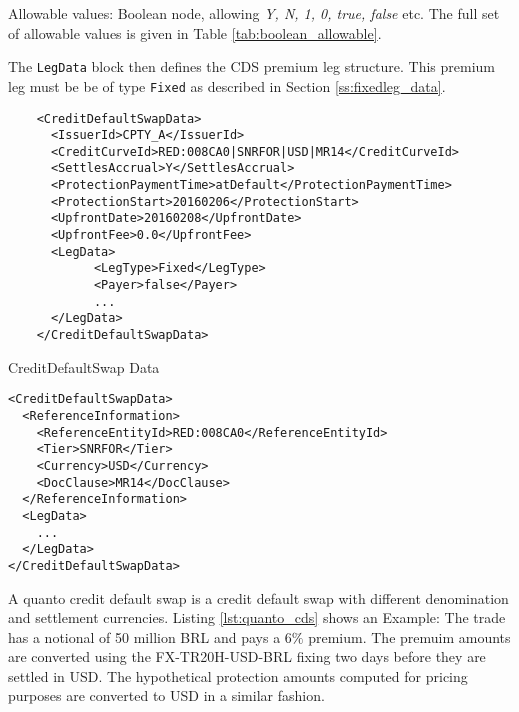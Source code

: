 \begin{itemize}
Allowable values: Boolean node, allowing \emph{Y, N, 1, 0, true, false} etc. The full set of allowable values is given in Table \ref{tab:boolean_allowable}.
\end{itemize}

The \lstinline!LegData! block then defines the CDS premium leg structure. This premium leg must be be of type \lstinline!Fixed! as described in Section \ref{ss:fixedleg_data}.

\begin{listing}[H]
\begin{verbatim}
    <CreditDefaultSwapData>
      <IssuerId>CPTY_A</IssuerId>
      <CreditCurveId>RED:008CA0|SNRFOR|USD|MR14</CreditCurveId>
      <SettlesAccrual>Y</SettlesAccrual>
      <ProtectionPaymentTime>atDefault</ProtectionPaymentTime>
      <ProtectionStart>20160206</ProtectionStart>
      <UpfrontDate>20160208</UpfrontDate>
      <UpfrontFee>0.0</UpfrontFee>
      <LegData>
            <LegType>Fixed</LegType>
            <Payer>false</Payer>
            ...
      </LegData>
    </CreditDefaultSwapData>
\end{verbatim}
\caption{CreditDefaultSwap Data}
\label{lst:cdsdata}
\end{listing}

\begin{listing}[H]
\begin{verbatim}
<CreditDefaultSwapData>
  <ReferenceInformation>
    <ReferenceEntityId>RED:008CA0</ReferenceEntityId>
    <Tier>SNRFOR</Tier>
    <Currency>USD</Currency>
    <DocClause>MR14</DocClause>
  </ReferenceInformation>
  <LegData>
    ...
  </LegData>
</CreditDefaultSwapData>
\end{verbatim}
\caption{\lstinline!CreditDefaultSwapData! with \lstinline!ReferenceInformation!}
\label{lst:cdsdata_with_ref_info}
\end{listing}

A quanto credit default swap is a credit default swap with different denomination and settlement currencies. Listing
\ref{lst:quanto_cds} shows an Example: The trade has a notional of 50 million BRL and pays a $6\%$ premium. The premuim
amounts are converted using the FX-TR20H-USD-BRL fixing two days before they are settled in USD. The hypothetical
protection amounts computed for pricing purposes are converted to USD in a similar fashion.


